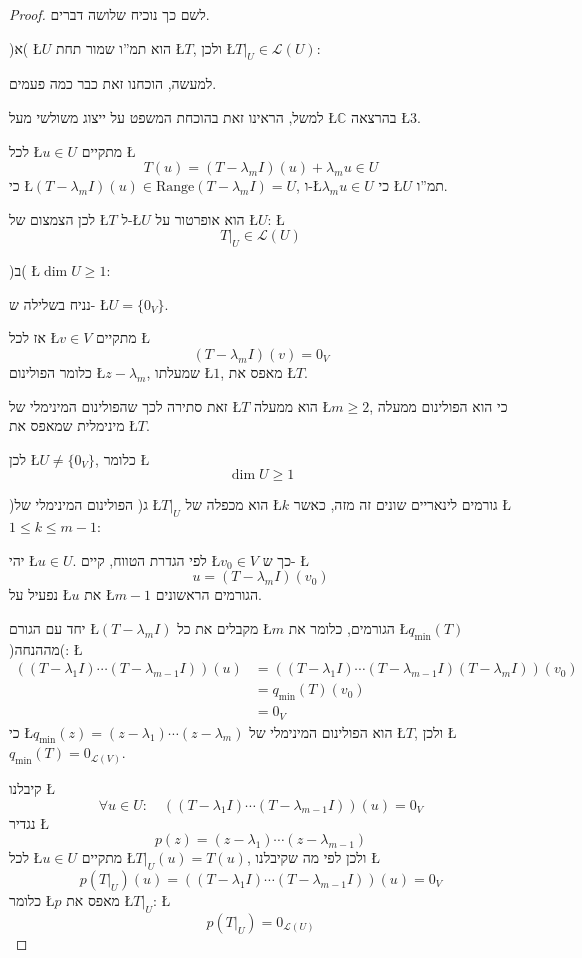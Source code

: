 \documentclass[english,hebrew]{article}
\begin{document}
\begin{proof}
לשם כך נוכיח שלושה דברים.

)א( \L{$U$} הוא תמ\textquotedblright ו שמור תחת \L{$T$}, ולכן \L{$T|_{U}\in\mathcal{L}(U)$}:

למעשה, הוכחנו זאת כבר כמה פעמים.

למשל, הראינו זאת בהוכחת המשפט על ייצוג משולשי מעל \L{$\mathbb{C}$}
בהרצאה \L{$3$}.

לכל \L{$u\in U$} מתקיים \L{%
\[
T(u)=(T-\lambda_{m}I)(u)+\lambda_{m}u\in U
\]
}%
כי \L{$(T-\lambda_{m}I)(u)\in\text{Range}(T-\lambda_{m}I)=U$}, ו-\L{$\lambda_{m}u\in U$}
כי \L{$U$} תמ\textquotedblright ו.

לכן הצמצום של \L{$T$} ל-\L{$U$} הוא אופרטור על \L{$U$}: \L{%
\[
T|_{U}\in\mathcal{L}(U)
\]
}%

)ב( \L{$\dim U\geq1$}:

נניח בשלילה ש- \L{$U=\{0_{V}\}$}.

אז לכל \L{$v\in V$} מתקיים \L{%
\[
(T-\lambda_{m}I)(v)=0_{V}
\]
}%
כלומר הפולינום \L{$z-\lambda_{m}$}, שמעלתו \L{$1$}, מאפס את \L{$T$}. 

זאת סתירה לכך שהפולינום המינימלי של \L{$T$} הוא ממעלה \L{$m\geq2$},
כי הוא הפולינום ממעלה מינימלית שמאפס את \L{$T$}.

לכן \L{$U\neq\{0_{V}\}$}, כלומר \L{%
\[
\dim U\geq1
\]
}%

)ג( הפולינום המינימלי של \L{$T|_{U}$} הוא מכפלה של \L{$k$} גורמים
לינאריים שונים זה מזה, כאשר \L{$1\leq k\leq m-1$}:

יהי \L{$u\in U$}. לפי הגדרת הטווח, קיים \L{$v_{0}\in V$} כך ש- \L{%
\[
u=(T-\lambda_{m}I)(v_{0})
\]
}%
נפעיל על \L{$u$} את \L{$m-1$} הגורמים הראשונים.

יחד עם הגורם \L{$(T-\lambda_{m}I)$} מקבלים את כל \L{$m$} הגורמים,
כלומר את \L{$q_{\min}(T)$} )מההנחה(: \L{%
\begin{align*}
\left((T-\lambda_{1}I)\cdots(T-\lambda_{m-1}I)\right)(u) & =\left((T-\lambda_{1}I)\cdots(T-\lambda_{m-1}I)(T-\lambda_{m}I)\right)(v_{0})\\
 & =q_{\min}(T)(v_{0})\\
 & =0_{V}
\end{align*}
}%
כי \L{$q_{\min}(z)=(z-\lambda_{1})\cdots(z-\lambda_{m})$} הוא הפולינום
המינימלי של \L{$T$}, ולכן \L{$q_{\min}(T)=0_{\mathcal{L}(V)}$}. 

קיבלנו \L{%
\[
\forall u\in U:\quad\left((T-\lambda_{1}I)\cdots(T-\lambda_{m-1}I)\right)(u)=0_{V}
\]
}%
נגדיר \L{%
\[
p(z)=(z-\lambda_{1})\cdots(z-\lambda_{m-1})
\]
}%
לכל \L{$u\in U$} מתקיים \L{$T|_{U}(u)=T(u)$}, ולכן לפי מה שקיבלנו
\L{%
\[
p\left(T|_{U}\right)(u)=\left((T-\lambda_{1}I)\cdots(T-\lambda_{m-1}I)\right)(u)=0_{V}
\]
}%
כלומר \L{$p$} מאפס את \L{$T|_{U}$}: \L{%
\[
p\left(T|_{U}\right)=0_{\mathcal{L}(U)}
\]
}%


\end{proof}
\end{document}
